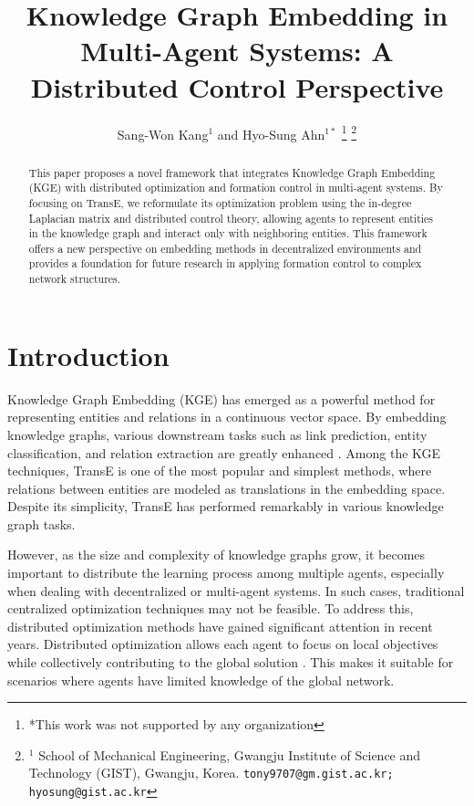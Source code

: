 \documentclass[letterpaper, 10 pt, conference]{ieeeconf}  %
\title{\LARGE \bf
Knowledge Graph Embedding in Multi-Agent Systems: A Distributed Control Perspective
}
\author{Sang-Won Kang${}^{1}$ and Hyo-Sung Ahn${}^{1*}$%
\thanks{*This work was not supported by any organization}%
\thanks{$^{1}$ School of Mechanical Engineering, Gwangju Institute of Science and Technology (GIST), Gwangju, Korea. 
        {\tt\small tony9707@gm.gist.ac.kr; hyosung@gist.ac.kr}}%
}
\begin{document}
\maketitle
\thispagestyle{empty}
\pagestyle{empty}

\begin{abstract}
This paper proposes a novel framework that integrates Knowledge Graph Embedding (KGE) with distributed optimization and formation control in multi-agent systems. By focusing on TransE, we reformulate its optimization problem using the in-degree Laplacian matrix and distributed control theory, allowing agents to represent entities in the knowledge graph and interact only with neighboring entities. This framework offers a new perspective on embedding methods in decentralized environments and provides a foundation for future research in applying formation control to complex network structures. 
\end{abstract}


\section{Introduction}
Knowledge Graph Embedding (KGE) has emerged as a powerful method for representing entities and relations in a continuous vector space. By embedding knowledge graphs, various downstream tasks such as link prediction, entity classification, and relation extraction are greatly enhanced \cite{wang_knowledge_2017}. Among the KGE techniques, TransE \cite{bordes_translating_2013} is one of the most popular and simplest methods, where relations between entities are modeled as translations in the embedding space. Despite its simplicity, TransE has performed remarkably in various knowledge graph tasks.

However, as the size and complexity of knowledge graphs grow, it becomes important to distribute the learning process among multiple agents, especially when dealing with decentralized or multi-agent systems. In such cases, traditional centralized optimization techniques may not be feasible. To address this, distributed optimization methods have gained significant attention in recent years. Distributed optimization allows each agent to focus on local objectives while collectively contributing to the global solution \cite{yang_survey_2019}. This makes it suitable for scenarios where agents have limited knowledge of the global network.
\end{document}
